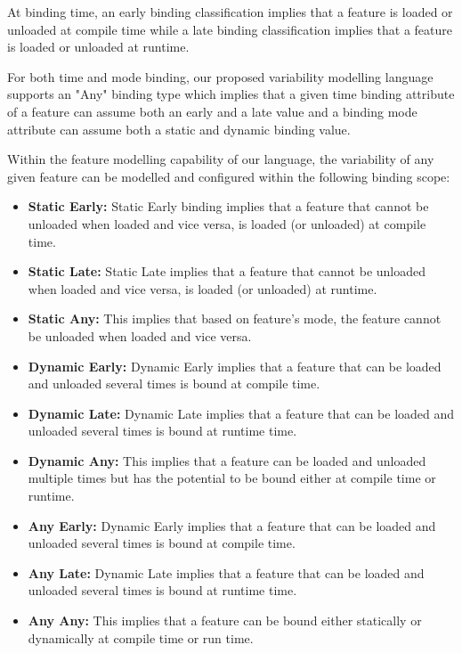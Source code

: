 \documentclass[conference]{IEEEtran}
\begin{document}
At binding time, an early binding classification implies that a feature is loaded or unloaded at compile time while a late binding classification implies that a feature is loaded or unloaded at runtime.

For both time and mode binding, our proposed variability modelling language supports an "Any" binding type which implies that a given time binding attribute of a feature can assume both an early and a late value and a binding mode attribute can assume both a static and dynamic binding value.

Within the feature modelling capability of our language, the variability of any given feature can be modelled and configured within the following binding scope:

\begin{itemize}
    
    \item \textbf{Static Early: } Static Early binding implies that a feature that cannot be unloaded when loaded and vice versa, is loaded (or unloaded) at compile time. 
    
    \item \textbf{Static Late: } Static Late implies that a feature that cannot be unloaded when loaded and vice versa, is loaded (or unloaded) at runtime.
    
    \item \textbf{Static Any: } This implies that based on feature's mode, the feature cannot be unloaded when loaded and vice versa.  
    
    \item \textbf{Dynamic Early: }Dynamic Early implies that a feature that can be loaded and unloaded several times is bound at compile time.
    
    \item \textbf{Dynamic Late: }Dynamic Late implies that a feature that can be loaded and unloaded several times is bound at runtime time.
    
    \item \textbf{Dynamic Any: } This implies that a feature can be loaded and unloaded multiple times but has the potential to be bound either at compile time or runtime.
    
    \item \textbf{Any Early: }Dynamic Early implies that a feature that can be loaded and unloaded several times is bound at compile time.
    
    \item \textbf{Any Late: }Dynamic Late implies that a feature that can be loaded and unloaded several times is bound at runtime time.
    
    \item \textbf{Any Any: } This implies that a feature can be bound either statically or dynamically at compile time or run time. 
    
\end{itemize}
\end{document}
